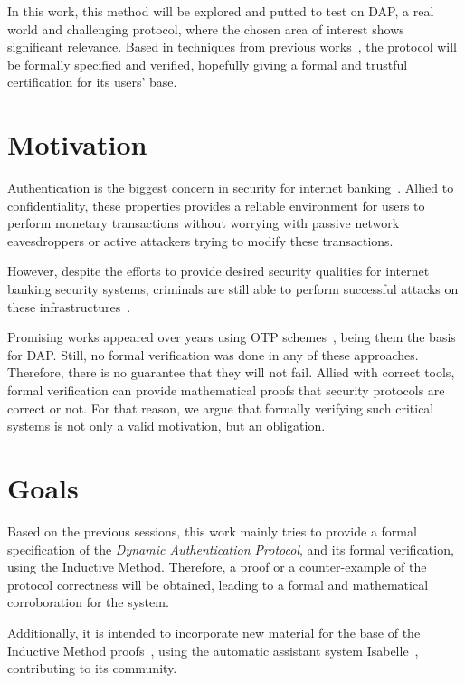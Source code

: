 In this work, this method will be explored and putted to test on DAP, a real world and challenging protocol, where the chosen area of interest shows significant relevance. Based in techniques from previous works~\cite{BellaPaulson2006, Paulson99, Paulson98}, the protocol will be formally specified and verified, hopefully giving a formal and trustful certification for its users' base.





\section{Motivation}
Authentication is the biggest concern in security for internet banking~\cite{Hutchinson2003}. Allied to confidentiality, these properties provides a reliable environment for users to perform monetary transactions without worrying with passive network eavesdroppers or active attackers trying to modify these transactions.

However, despite the efforts to provide desired security qualities for internet banking security systems, criminals are still able to perform successful attacks on these infrastructures~\cite{Adham2013}.

Promising works appeared over years using OTP schemes~\cite{Starnberger2009, LeeHyunLim2010}, being them the basis for DAP\@. Still, no formal verification was done in any of these approaches. Therefore, there is no guarantee that they will not fail. Allied with correct tools, formal verification can provide mathematical proofs that security protocols are correct or not. For that reason, we argue that formally verifying such critical systems is not only a valid motivation, but an obligation.




\section{Goals}
Based on the previous sessions, this work mainly tries to provide a formal specification of the \textit{Dynamic Authentication Protocol}, and its formal verification, using the Inductive Method. Therefore, a proof or a counter-example of the protocol correctness will be obtained, leading to a formal and mathematical corroboration for the system.

Additionally, it is intended to incorporate new material for the base of the Inductive Method proofs~\cite{isabelle-hol-auth}, using the automatic assistant system Isabelle~\cite{isabelle}, contributing to its community.

